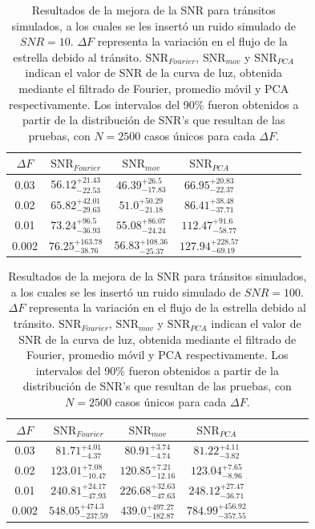 \begin{table}[H]
	\centering
	\begin{tabular}{ccccccccc}
	\hline 
	$\Delta F$ & $\mbox{SNR}_{Fourier}$ &  $\mbox{SNR}_{mov}$ & $\mbox{SNR}_{PCA}$\\ 
	\hline
	0.03 & 	${56.12}_{-22.53}^{+21.43}$ & ${46.39}_{-17.83}^{+26.5}$ & ${66.95}_{-22.37}^{+20.83}$ \\
	0.02 &  ${65.82}_{-29.63}^{+42.01}$ & ${51.0}_{-21.18}^{+50.29}$ & ${86.41}_{-37.71}^{+38.48}$ \\
	0.01 & ${73.24}_{-36.93}^{+96.5}$ & ${55.08}_{-24.24}^{+86.07}$ & ${112.47}_{-58.77}^{+91.6}$ \\
	0.002 & ${76.25}_{-38.76}^{+163.78}$ & ${56.83}_{-25.37}^{+108.36}$	& ${127.94}_{-69.19}^{+228.57}$ \\
	\hline 
	\end{tabular} 
	\caption{Resultados de la mejora de la SNR para tránsitos simulados, a los cuales se les insertó un ruido simulado de $SNR=10$. $\Delta F$ representa la variación en el flujo de la estrella debido al tránsito. $\mbox{SNR}_{Fourier}$, $\mbox{SNR}_{mov}$ y $\mbox{SNR}_{PCA}$ indican el valor de SNR de la curva de luz, obtenida mediante el filtrado de Fourier, promedio móvil y PCA respectivamente. Los intervalos del 90\% fueron obtenidos a partir de la distribución de SNR's que resultan de las pruebas, con $N=2500$ casos únicos para cada $\Delta F$.}
	\label{tab_mejora_snr_10}
	\end{table}


\begin{table}[H]
	\centering
	\begin{tabular}{ccccccccc}
	\hline 
	$\Delta F$ & $\mbox{SNR}_{Fourier}$ &  $\mbox{SNR}_{mov}$ & $\mbox{SNR}_{PCA}$\\ 
	\hline
	0.03 & 	${81.71}_{-4.37}^{+4.01}$ & ${80.91}_{-4.74}^{+3.74}$ & ${81.22}_{-3.82}^{+4.11}$ \\
	0.02 &  ${123.01}_{-10.47}^{+7.08}$ & ${120.85}_{-12.16}^{+7.21}$ & ${123.04}_{-8.96}^{+7.65}$ \\
	0.01 & ${240.81}_{-47.93}^{+24.17}$ & ${226.68}_{-47.63}^{+32.63}$ & ${248.12}_{-36.71}^{+27.47}$ \\
	0.002 & ${548.05}_{-237.59}^{+474.3}$ & ${439.0}_{-182.87}^{+497.27}$ & ${784.99}_{-357.55}^{+456.92}$ \\
	\hline 
	\end{tabular} 
	\caption{Resultados de la mejora de la SNR para tránsitos simulados, a los cuales se les insertó un ruido simulado de $SNR=100$. $\Delta F$ representa la variación en el flujo de la estrella debido al tránsito. $\mbox{SNR}_{Fourier}$, $\mbox{SNR}_{mov}$ y $\mbox{SNR}_{PCA}$ indican el valor de SNR de la curva de luz, obtenida mediante el filtrado de Fourier, promedio móvil y PCA respectivamente. Los intervalos del 90\% fueron obtenidos a partir de la distribución de SNR's que resultan de las pruebas, con $N=2500$ casos únicos para cada $\Delta F$.}
	\label{tab_mejora_snr_100}
	\end{table}

